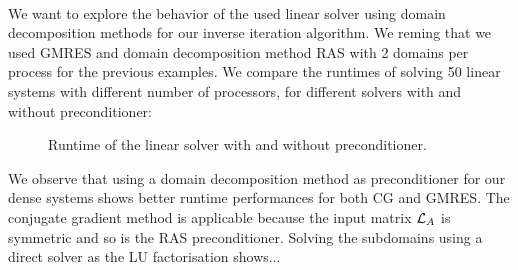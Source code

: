 \paragraph{}
We want to explore the behavior of the used linear solver using domain decomposition methods for our inverse iteration algorithm.
We reming that we used GMRES and domain decomposition method RAS with 2 domains per process for the previous examples.
We compare the runtimes of solving 50 linear systems with different number of processors, for different solvers with and without preconditioner:

\begin{figure}[H]
 \centering
 
 \caption{Runtime of the linear solver with and without preconditioner.}
\end{figure}

We observe that using a domain decomposition method as preconditioner for our dense systems shows better runtime performances for both CG and GMRES.
The conjugate gradient method is applicable because the input matrix \(\operatorname{\mathcal{L}}_A\) is symmetric and so is the RAS preconditioner.
Solving the subdomains using a direct solver as the LU factorisation shows...
